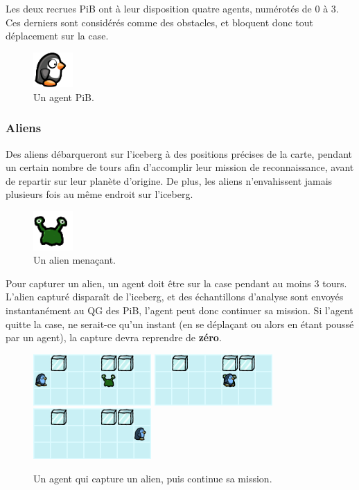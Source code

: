 Les deux recrues PiB ont à leur disposition quatre agents, numérotés de
0 à 3. Ces derniers sont considérés comme des obstacles, et bloquent
donc tout déplacement sur la case.

\begin{figure}[!h]
    \centering
    \includegraphics[width=1.5cm]{img/penguin}
    \caption*{Un agent PiB.}
\end{figure}

\subsubsection{Aliens}\label{aliens}

Des aliens débarqueront sur l'iceberg à des positions précises de la
carte, pendant un certain nombre de tours afin d'accomplir leur mission
de reconnaissance, avant de repartir sur leur planète d'origine. De
plus, les aliens n'envahissent jamais plusieurs fois au même endroit sur
l'iceberg.

\begin{figure}[!h]
    \centering
    \includegraphics[width=1.5cm]{img/alien}
    \caption*{Un alien menaçant.}
\end{figure}

Pour capturer un alien, un agent doit être sur la case pendant au moins
3 tours. L'alien capturé disparaît de l'iceberg, et des échantillons
d'analyse sont envoyés instantanément au QG des PiB, l'agent peut donc
continuer sa mission. Si l'agent quitte la case, ne serait-ce qu'un
instant (en se déplaçant ou alors en étant poussé par un agent), la
capture devra reprendre de \textbf{zéro}.

\begin{figure}[!h]
    \centering
    \includegraphics[width=4.5cm]{img/alien_capture1}
    \includegraphics[width=4.5cm]{img/alien_capture2}
    \includegraphics[width=4.5cm]{img/alien_capture3}
    \caption*{Un agent qui capture un alien, puis continue sa mission.}
\end{figure}

